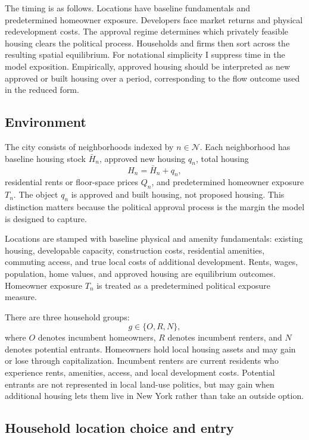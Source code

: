 The timing is as follows.
Locations have baseline fundamentals and predetermined homeowner exposure.
Developers face market returns and physical redevelopment costs.
The approval regime determines which privately feasible housing clears the political process.
Households and firms then sort across the resulting spatial equilibrium.
For notational simplicity I suppress time in the model exposition.
Empirically, approved housing should be interpreted as new approved or built housing over a period, corresponding to the flow outcome used in the reduced form.

\subsection{Environment}

The city consists of neighborhoods indexed by \(n\in\mathcal{N}\).
Each neighborhood has baseline housing stock \(\bar H_n\), approved new housing \(q_n\), total housing
\[
    H_n = \bar H_n + q_n,
\]
residential rents or floor-space prices \(Q_n\), and predetermined homeowner exposure \(T_n\).
The object \(q_n\) is approved and built housing, not proposed housing.
This distinction matters because the political approval process is the margin the model is designed to capture.

Locations are stamped with baseline physical and amenity fundamentals: existing housing, developable capacity, construction costs, residential amenities, commuting access, and true local costs of additional development.
Rents, wages, population, home values, and approved housing are equilibrium outcomes.
Homeowner exposure \(T_n\) is treated as a predetermined political exposure measure.

There are three household groups:
\[
    g\in\{O,R,N\},
\]
where \(O\) denotes incumbent homeowners, \(R\) denotes incumbent renters, and \(N\) denotes potential entrants.
Homeowners hold local housing assets and may gain or lose through capitalization.
Incumbent renters are current residents who experience rents, amenities, access, and local development costs.
Potential entrants are not represented in local land-use politics, but may gain when additional housing lets them live in New York rather than take an outside option.

\subsection{Household location choice and entry}

